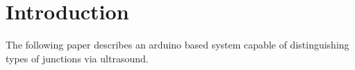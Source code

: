 \section{Introduction}
The following paper describes an arduino based system capable of distinguishing types of junctions via ultrasound.